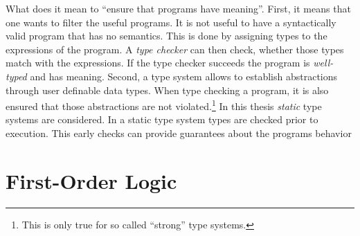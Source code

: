 What does it mean to ``ensure that programs have meaning''. First, it
means that one wants to filter the useful programs. It is not useful
to have a syntactically valid program that has no semantics. This is
done by assigning types to the expressions of the program. A
\textit{type checker} can then check, whether those types match with
the expressions. If the type checker succeeds the program is
\textit{well-typed} and has meaning. Second, a type system allows to
establish abstractions through user definable data types. When type
checking a program, it is also ensured that those abstractions are not
violated.\footnote{This is only true for so called ``strong'' type
  systems.} In this thesis \textit{static} type systems are
considered. In a static type system types are checked prior to
execution. This early checks can provide guarantees about the programs
behavior 
\section{First-Order Logic}

